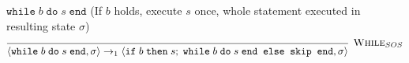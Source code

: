  $\texttt{while} \; b \; \texttt{do} \; s \; \texttt{end}$ (If $b$ holds, execute $s$ once, whole statement executed in resulting state $\sigma$)
\[
    \begin{prooftree}
        \infer0[\textsc{While}$_{SOS}$]{\langle \texttt{while} \; b \; \texttt{do} \; s \; \texttt{end}, \sigma \rangle \rightarrow_1 
        \langle \texttt{if} \; b \; \texttt{then} \; s; \; \texttt{while} \; b \; \texttt{do} \; s \; \texttt{end else skip end}, \sigma \rangle}
    \end{prooftree}
\]
